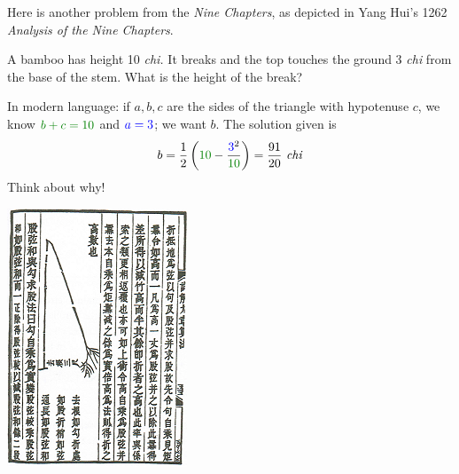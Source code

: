 \goodbreak






\begin{minipage}[t]{0.64\linewidth}\vspace{0pt}
	Here is another problem from the \emph{Nine Chapters}, as depicted in Yang Hui's 1262 \emph{Analysis of the Nine Chapters}.\smallbreak
	
	A bamboo has height 10 \emph{chi.} It breaks and the top touches the ground 3 \emph{chi} from the base of the stem. What is the height of the break?\smallbreak
	
	In modern language: if $a,b,c$ are the sides of the triangle with hypotenuse $c$, we know $\textcolor{Green}{b+c=10}$ and $\textcolor{blue}{a=3}$; we want $b$. The solution given is
	\[
		b=\frac 12\left(\textcolor{Green}{10}-\frac{\textcolor{blue}{3}^2}{\textcolor{Green}{10}}\right)=\frac{91}{20}\text{ \emph{chi}}
	\]
	Think about why!
\end{minipage}
\hfill
\begin{minipage}[t]{0.33\linewidth}\vspace{0pt}
	\flushright\includegraphics[scale=1]{bamboo-small}
\end{minipage}



